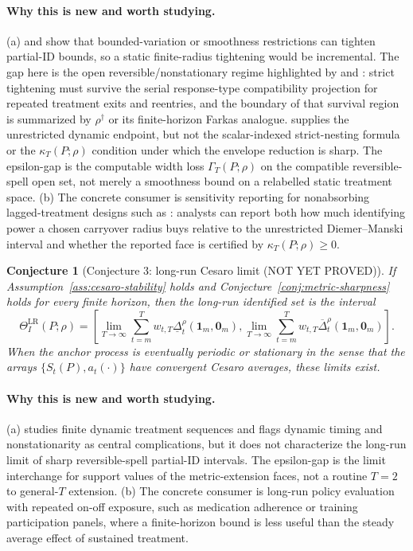 \documentclass[11pt]{article}
\theoremstyle{definition}
\theoremstyle{plain}
\newtheorem{conjecture}{Conjecture}
\theoremstyle{remark}
\begin{document}
\paragraph{Why this is new and worth studying.}
(a) \citet{ManskiPepper2018} and \citet{KimKwonKwonLee2018} show that bounded-variation or smoothness restrictions can tighten partial-ID bounds, so a static finite-radius tightening would be incremental.  The gap here is the open reversible/nonstationary regime highlighted by \citet{Han2021} and \citet{DeChaisemartinDHaultfoeuille2024}: strict tightening must survive the serial response-type compatibility projection for repeated treatment exits and reentries, and the boundary of that survival region is summarized by \(\rho^\dagger\) or its finite-horizon Farkas analogue.  \citet{DiemerShiSwanson2024} supplies the unrestricted dynamic endpoint, but not the scalar-indexed strict-nesting formula or the \(\kappa_T(P;\rho)\) condition under which the envelope reduction is sharp.  The epsilon-gap is the computable width loss \(\Gamma_T(P;\rho)\) on the compatible reversible-spell open set, not merely a smoothness bound on a relabelled static treatment space.  (b) The concrete consumer is sensitivity reporting for nonabsorbing lagged-treatment designs such as \citet{DeChaisemartinDHaultfoeuille2024}: analysts can report both how much identifying power a chosen carryover radius buys relative to the unrestricted Diemer--Manski interval and whether the reported face is certified by \(\kappa_T(P;\rho)\ge0\).

\begin{conjecture}[Conjecture 3: long-run Cesaro limit (NOT YET PROVED)]\label{conj:long-run}
If Assumption~\ref{ass:cesaro-stability} holds and Conjecture~\ref{conj:metric-sharpness} holds for every finite horizon, then the long-run identified set is the interval
\[
  \Theta_I^{\mathrm{LR}}(P;\rho)
  =
  \left[
    \lim_{T\to\infty}\sum_{t=m}^T w_{t,T}\underline\Delta_t^\rho(\mathbf{1}_m,\mathbf{0}_m),
    \lim_{T\to\infty}\sum_{t=m}^T w_{t,T}\overline\Delta_t^\rho(\mathbf{1}_m,\mathbf{0}_m)
  \right].
\]
When the anchor process is eventually periodic or stationary in the sense that the arrays \(\{S_t(P),a_t(\cdot)\}\) have convergent Cesaro averages, these limits exist.
\end{conjecture}
\paragraph{Why this is new and worth studying.}
(a) \citet{Han2021} studies finite dynamic treatment sequences and flags dynamic timing and nonstationarity as central complications, but it does not characterize the long-run limit of sharp reversible-spell partial-ID intervals.  The epsilon-gap is the limit interchange for support values of the metric-extension faces, not a routine \(T=2\) to general-\(T\) extension.  (b) The concrete consumer is long-run policy evaluation with repeated on-off exposure, such as medication adherence or training participation panels, where a finite-horizon bound is less useful than the steady average effect of sustained treatment.
\end{document}
